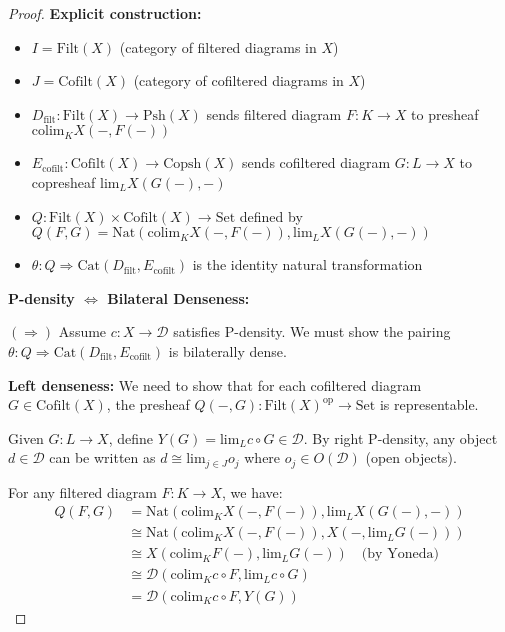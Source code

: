 \documentclass[11pt]{article}
\theoremstyle{plain}
\theoremstyle{definition}
\theoremstyle{remark}
\newcommand{\op}{\mathrm{op}}
\newcommand{\id}{\mathrm{id}}
\newcommand{\colim}{\mathrm{colim}}
\renewcommand{\lim}{\mathrm{lim}}
\begin{document}
\begin{proof}
\textbf{Explicit construction:}
\begin{itemize}
\item $I = \mathrm{Filt}(X)$ (category of filtered diagrams in $X$)
\item $J = \mathrm{Cofilt}(X)$ (category of cofiltered diagrams in $X$)  
\item $D_{\text{filt}} : \mathrm{Filt}(X) \to \mathrm{Psh}(X)$ sends filtered diagram $F : K \to X$ to presheaf $\colim_K X(-, F(-))$
\item $E_{\text{cofilt}} : \mathrm{Cofilt}(X) \to \mathrm{Copsh}(X)$ sends cofiltered diagram $G : L \to X$ to copresheaf $\lim_L X(G(-), -)$
\item $Q : \mathrm{Filt}(X) \times \mathrm{Cofilt}(X) \to \mathrm{Set}$ defined by $Q(F,G) = \mathrm{Nat}(\colim_K X(-, F(-)), \lim_L X(G(-), -))$
\item $\theta : Q \Rightarrow \mathrm{Cat}(D_{\text{filt}}, E_{\text{cofilt}})$ is the identity natural transformation
\end{itemize}

\begin{center}
\end{center}

\textbf{P-density $\Leftrightarrow$ Bilateral Denseness:} 

$(\Rightarrow)$ Assume $c : X \to \mathcal{D}$ satisfies P-density. We must show the pairing $\theta : Q \Rightarrow \mathrm{Cat}(D_{\text{filt}}, E_{\text{cofilt}})$ is bilaterally dense.

\textbf{Left denseness:} We need to show that for each cofiltered diagram $G \in \mathrm{Cofilt}(X)$, the presheaf $Q(-, G) : \mathrm{Filt}(X)^{\op} \to \mathrm{Set}$ is representable.

Given $G : L \to X$, define $Y(G) = \lim_L c \circ G \in \mathcal{D}$. By right P-density, any object $d \in \mathcal{D}$ can be written as $d \cong \lim_{j \in J} o_j$ where $o_j \in O(\mathcal{D})$ (open objects).

For any filtered diagram $F : K \to X$, we have:
\begin{align}
Q(F, G) &= \mathrm{Nat}(\colim_K X(-, F(-)), \lim_L X(G(-), -)) \\
&\cong \mathrm{Nat}(\colim_K X(-, F(-)), X(-, \lim_L G(-))) \\
&\cong X(\colim_K F(-), \lim_L G(-)) \quad \text{(by Yoneda)} \\
&\cong \mathcal{D}(\colim_K c \circ F, \lim_L c \circ G) \\
&= \mathcal{D}(\colim_K c \circ F, Y(G))
\end{align}


\end{proof}
\end{document}
